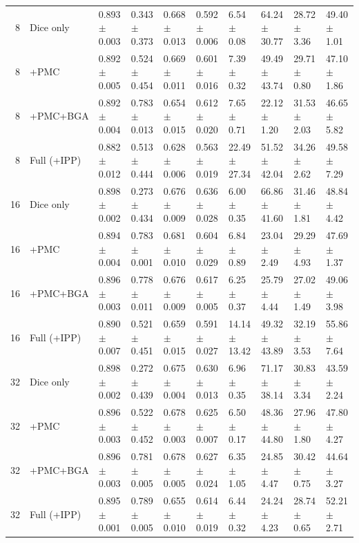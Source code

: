 \documentclass[10pt]{article}
\begin{document}
\begin{landscape}
{\begin{longtable}{r l l l l l l l l l}
8 & Dice only & 0.893 $\pm$ 0.003 & 0.343 $\pm$ 0.373 & 0.668 $\pm$ 0.013 & 0.592 $\pm$ 0.006 & 6.54 $\pm$ 0.08 & 64.24 $\pm$ 30.77 & 28.72 $\pm$ 3.36 & 49.40 $\pm$ 1.01 \\
8 & +PMC & 0.892 $\pm$ 0.005 & 0.524 $\pm$ 0.454 & 0.669 $\pm$ 0.011 & 0.601 $\pm$ 0.016 & 7.39 $\pm$ 0.32 & 49.49 $\pm$ 43.74 & 29.71 $\pm$ 0.80 & 47.10 $\pm$ 1.86 \\
8 & +PMC+BGA & 0.892 $\pm$ 0.004 & 0.783 $\pm$ 0.013 & 0.654 $\pm$ 0.015 & 0.612 $\pm$ 0.020 & 7.65 $\pm$ 0.71 & 22.12 $\pm$ 1.20 & 31.53 $\pm$ 2.03 & 46.65 $\pm$ 5.82 \\
8 & Full (+IPP) & 0.882 $\pm$ 0.012 & 0.513 $\pm$ 0.444 & 0.628 $\pm$ 0.006 & 0.563 $\pm$ 0.019 & 22.49 $\pm$ 27.34 & 51.52 $\pm$ 42.04 & 34.26 $\pm$ 2.62 & 49.58 $\pm$ 7.29 \\
16 & Dice only & 0.898 $\pm$ 0.002 & 0.273 $\pm$ 0.434 & 0.676 $\pm$ 0.009 & 0.636 $\pm$ 0.028 & 6.00 $\pm$ 0.35 & 66.86 $\pm$ 41.60 & 31.46 $\pm$ 1.81 & 48.84 $\pm$ 4.42 \\
16 & +PMC & 0.894 $\pm$ 0.004 & 0.783 $\pm$ 0.001 & 0.681 $\pm$ 0.010 & 0.604 $\pm$ 0.029 & 6.84 $\pm$ 0.89 & 23.04 $\pm$ 2.49 & 29.29 $\pm$ 4.93 & 47.69 $\pm$ 1.37 \\
16 & +PMC+BGA & 0.896 $\pm$ 0.003 & 0.778 $\pm$ 0.011 & 0.676 $\pm$ 0.009 & 0.617 $\pm$ 0.005 & 6.25 $\pm$ 0.37 & 25.79 $\pm$ 4.44 & 27.02 $\pm$ 1.49 & 49.06 $\pm$ 3.98 \\
16 & Full (+IPP) & 0.890 $\pm$ 0.007 & 0.521 $\pm$ 0.451 & 0.659 $\pm$ 0.015 & 0.591 $\pm$ 0.027 & 14.14 $\pm$ 13.42 & 49.32 $\pm$ 43.89 & 32.19 $\pm$ 3.53 & 55.86 $\pm$ 7.64 \\
32 & Dice only & 0.898 $\pm$ 0.002 & 0.272 $\pm$ 0.439 & 0.675 $\pm$ 0.004 & 0.630 $\pm$ 0.013 & 6.96 $\pm$ 0.35 & 71.17 $\pm$ 38.14 & 30.83 $\pm$ 3.34 & 43.59 $\pm$ 2.24 \\
32 & +PMC & 0.896 $\pm$ 0.003 & 0.522 $\pm$ 0.452 & 0.678 $\pm$ 0.003 & 0.625 $\pm$ 0.007 & 6.50 $\pm$ 0.17 & 48.36 $\pm$ 44.80 & 27.96 $\pm$ 1.80 & 47.80 $\pm$ 4.27 \\
32 & +PMC+BGA & 0.896 $\pm$ 0.003 & 0.781 $\pm$ 0.005 & 0.678 $\pm$ 0.005 & 0.627 $\pm$ 0.024 & 6.35 $\pm$ 1.05 & 24.85 $\pm$ 4.47 & 30.42 $\pm$ 0.75 & 44.64 $\pm$ 3.27 \\
32 & Full (+IPP) & 0.895 $\pm$ 0.001 & 0.789 $\pm$ 0.005 & 0.655 $\pm$ 0.010 & 0.614 $\pm$ 0.019 & 6.44 $\pm$ 0.32 & 24.24 $\pm$ 4.23 & 28.74 $\pm$ 0.65 & 52.21 $\pm$ 2.71 \\
\end{longtable}
}
\end{landscape}
\end{document}
